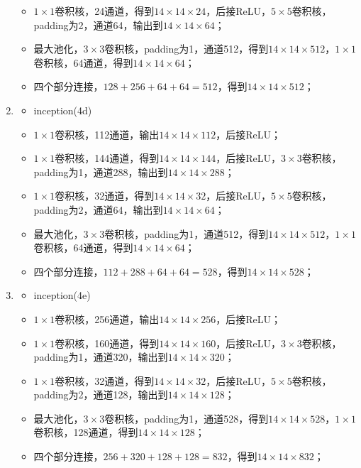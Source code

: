 \begin{enumerate}
\begin{itemize}
		      \item $1\times1$卷积核，24通道，得到$14\times14\times24$，后接ReLU，$5\times5$卷积核，padding为2，通道64，输出到$14\times14\times64$；
		      \item 最大池化，$3\times3$卷积核，padding为1，通道512，得到$14\times14\times512$，$1\times1$卷积核，64通道，得到$14\times14\times64$；
		      \item 四个部分连接，$128+256+64+64=512$，得到$14\times14\times512$；
	      \end{itemize}
	\item
	      \begin{itemize}
		      \item inception(4d)
		      \item $1\times1$卷积核，112通道，输出$14\times14\times112$，后接ReLU；
		      \item $1\times1$卷积核，144通道，得到$14\times14\times144$，后接ReLU，$3\times3$卷积核，padding为1，通道288，输出到$14\times14\times288$；
		      \item $1\times1$卷积核，32通道，得到$14\times14\times32$，后接ReLU，$5\times5$卷积核，padding为2，通道64，输出到$14\times14\times64$；
		      \item 最大池化，$3\times3$卷积核，padding为1，通道512，得到$14\times14\times512$，$1\times1$卷积核，64通道，得到$14\times14\times64$；
		      \item 四个部分连接，$112+288+64+64=528$，得到$14\times14\times528$；
	      \end{itemize}
	\item
	      \begin{itemize}
		      \item inception(4e)
		      \item $1\times1$卷积核，256通道，输出$14\times14\times256$，后接ReLU；
		      \item $1\times1$卷积核，160通道，得到$14\times14\times160$，后接ReLU，$3\times3$卷积核，padding为1，通道320，输出到$14\times14\times320$；
		      \item $1\times1$卷积核，32通道，得到$14\times14\times32$，后接ReLU，$5\times5$卷积核，padding为2，通道128，输出到$14\times14\times128$；
		      \item 最大池化，$3\times3$卷积核，padding为1，通道528，得到$14\times14\times528$，$1\times1$卷积核，128通道，得到$14\times14\times128$；
		      \item 四个部分连接，$256+320+128+128=832$，得到$14\times14\times832$；
	      \end{itemize}

\end{enumerate}
